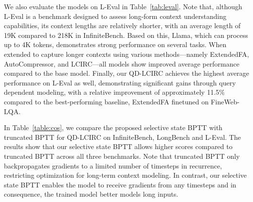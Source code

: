 We also evaluate the models on L-Eval in Table~\ref{tab:leval}.
Note that, although L-Eval is a benchmark designed to assess long-form context understanding capabilities, its context lengths are relatively shorter, with an average length of 19K compared to 218K in InfiniteBench. 
Based on this, Llama, which can process up to 4K tokens, demonstrates strong performance on several tasks. 
When extended to capture longer contexts using various methods—namely ExtendedFA, AutoCompressor, and LCIRC—all models show improved average performance compared to the base model.
Finally, our QD-LCIRC achieves the highest average performance on L-Eval as well, demonstrating significant gains through query dependent modeling, with a relative improvement of approximately 11.5\% compared to the best-performing baseline, ExtendedFA finetuned on FineWeb-LQA.

In Table~\ref{table:cos}, we compare the proposed selective state BPTT with truncated BPTT for QD-LCIRC on InfiniteBench, LongBench and L-Eval.
The results show that our selective state BPTT allows higher scores compared to truncated BPTT across all three benchmarks.
Note that truncated BPTT only backpropagates gradients to a limited number of timesteps in recurrence, restricting optimization for long-term context modeling.
In contrast, our selective state BPTT enables the model to receive gradients from any timesteps and in consequence, the trained model better models long inputs.



